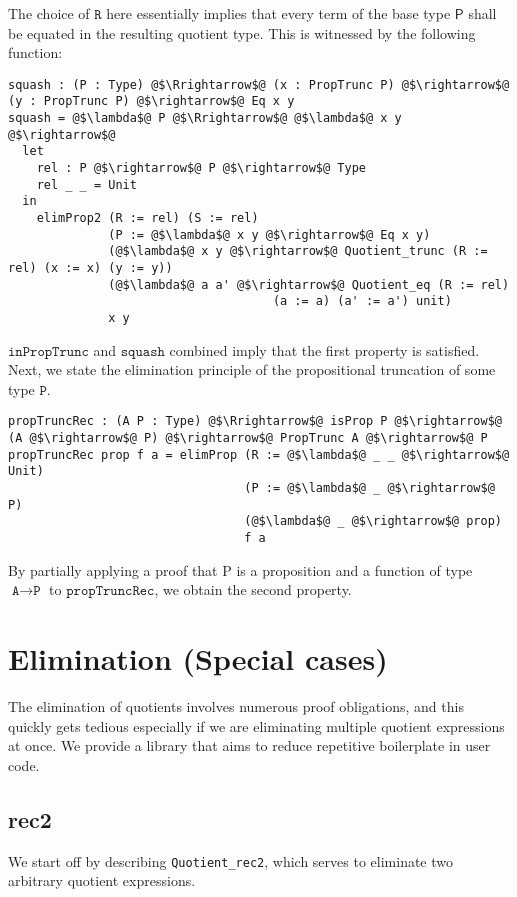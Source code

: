 \documentclass[12pt,twoside,maitrise]{dms}
\theoremstyle{definition}
\numberwithin{equation}{section}
\numberwithin{table}{chapter}
\numberwithin{figure}{chapter}
\newcommand\kw[1] {\textsf{#1}}
\newcommand\id[1] {\texttt{#1}}
\begin{document}
The choice of $\id{R}$ here essentially implies that every term of the base type $\kw{P}$ shall be equated in the resulting quotient type. This is witnessed by the following function:

\begin{verbatim}
squash : (P : Type) @$\Rrightarrow$@ (x : PropTrunc P) @$\rightarrow$@ (y : PropTrunc P) @$\rightarrow$@ Eq x y
squash = @$\lambda$@ P @$\Rrightarrow$@ @$\lambda$@ x y @$\rightarrow$@
  let
    rel : P @$\rightarrow$@ P @$\rightarrow$@ Type
    rel _ _ = Unit
  in
    elimProp2 (R := rel) (S := rel)
              (P := @$\lambda$@ x y @$\rightarrow$@ Eq x y)
              (@$\lambda$@ x y @$\rightarrow$@ Quotient_trunc (R := rel) (x := x) (y := y))
              (@$\lambda$@ a a' @$\rightarrow$@ Quotient_eq (R := rel)
                                     (a := a) (a' := a') unit)
              x y
\end{verbatim}

$\id{inPropTrunc}$ and $\id{squash}$ combined imply that the first property is satisfied. Next, we state the elimination principle of the propositional truncation of some type $\id{P}$.

\begin{verbatim}
propTruncRec : (A P : Type) @$\Rrightarrow$@ isProp P @$\rightarrow$@ (A @$\rightarrow$@ P) @$\rightarrow$@ PropTrunc A @$\rightarrow$@ P
propTruncRec prop f a = elimProp (R := @$\lambda$@ _ _ @$\rightarrow$@ Unit)
                                 (P := @$\lambda$@ _ @$\rightarrow$@ P)
                                 (@$\lambda$@ _ @$\rightarrow$@ prop)
                                 f a
\end{verbatim}

By partially applying a proof that P is a proposition and a function of type
$\id{A} \rightarrow \id{P}$ to $\id{propTruncRec}$, we obtain the second
property.

\section{Elimination (Special cases)}

The elimination of quotients involves numerous proof obligations, and this
quickly gets tedious especially if we are eliminating multiple quotient
expressions at once. We provide a library that aims to reduce repetitive
boilerplate in user code.

\subsection*{rec2}\label{subsec:rec2}
We start off by describing \id{Quotient\_rec2}, which serves to eliminate two arbitrary quotient expressions.
\end{document}
